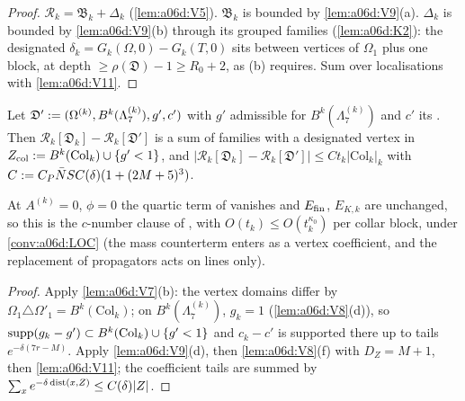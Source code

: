 \begin{proof}
$\mathcal R_k=\mathfrak B_k+\Delta_k$ (\cref{lem:a06d:V5}). $\mathfrak B_k$ is bounded by \cref{lem:a06d:V9}(a). $\Delta_k$ is bounded by \cref{lem:a06d:V9}(b) through its grouped families (\cref{lem:a06d:K2}): the designated $\delta_k=G_k(\Omega,0)-G_k(T,0)$ sits between vertices of $\Omega_1$ plus one block, at depth $\ge\rho(\mathfrak D)-1\ge R_0+2$, as (b) requires. Sum over localisations with \cref{lem:a06d:V11}.
\end{proof}

\begin{corollary}\label{cor:a06d:V13}
Let $\mathfrak D':=(\Omega^{(k)},B^k(\Lambda^{(k)}_7),g',c')$ with $g'$ admissible for $B^k(\Lambda^{(k)}_7)$ and $c'$ its \cite[(1.29)]{Ba3}. Then $\mathcal R_k[\mathfrak D_k]-\mathcal R_k[\mathfrak D']$ is a sum of families with a designated vertex in $Z_{\mathrm{col}}:= B^k(\mathrm{Col}_k)\cup\{g'<1\}$, and $|\mathcal R_k[\mathfrak D_k]-\mathcal R_k[\mathfrak D']|\le Ct_k|\mathrm{Col}_k|_k$ with $C:= C_P\bar NSC(\delta)(1+(2M+5)^3)$.
\end{corollary}

At $A^{(k)}=0$, $\phi=0$ the quartic term of \cite[(2.57)]{Ba2} vanishes and $E_{\mathrm{fin}}$, $E_{K,k}$ are unchanged, so this is the $c$-number clause of \cite[(2.57)]{Ba2}, with $O(t_k)\le O(t_k^{\kappa_0})$ per collar block, under \cref{conv:a06d:LOC} (the mass counterterm enters as a vertex coefficient, and the replacement of propagators acts on lines only).

\begin{proof}
Apply \cref{lem:a06d:V7}(b): the vertex domains differ by $\Omega_1\triangle\Omega'_1=B^k(\mathrm{Col}_k)$; on $B^k(\Lambda^{(k)}_7)$, $g_k=1$ (\cref{lem:a06d:V8}(d)), so $\operatorname{supp}(g_k-g')\subset B^k(\mathrm{Col}_k)\cup\{g'<1\}$ and $c_k-c'$ is supported there up to tails $e^{-\delta(7r-M)}$. Apply \cref{lem:a06d:V9}(d), then \cref{lem:a06d:V8}(f) with $D_Z=M+1$, then \cref{lem:a06d:V11}; the coefficient tails are summed by $\sum_xe^{-\delta\operatorname{dist}(x,Z)}\le C(\delta)|Z|$.
\end{proof}
